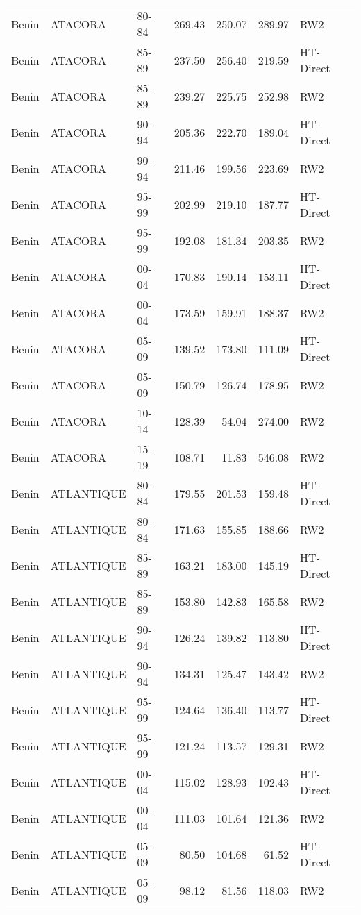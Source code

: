 \begin{longtable}{lllrrrl}
  Benin & ATACORA & 80-84 & 269.43 & 250.07 & 289.97 & RW2 \\ 
  Benin & ATACORA & 85-89 & 237.50 & 256.40 & 219.59 & HT-Direct \\ 
  Benin & ATACORA & 85-89 & 239.27 & 225.75 & 252.98 & RW2 \\ 
  Benin & ATACORA & 90-94 & 205.36 & 222.70 & 189.04 & HT-Direct \\ 
  Benin & ATACORA & 90-94 & 211.46 & 199.56 & 223.69 & RW2 \\ 
  Benin & ATACORA & 95-99 & 202.99 & 219.10 & 187.77 & HT-Direct \\ 
  Benin & ATACORA & 95-99 & 192.08 & 181.34 & 203.35 & RW2 \\ 
  Benin & ATACORA & 00-04 & 170.83 & 190.14 & 153.11 & HT-Direct \\ 
  Benin & ATACORA & 00-04 & 173.59 & 159.91 & 188.37 & RW2 \\ 
  Benin & ATACORA & 05-09 & 139.52 & 173.80 & 111.09 & HT-Direct \\ 
  Benin & ATACORA & 05-09 & 150.79 & 126.74 & 178.95 & RW2 \\ 
  Benin & ATACORA & 10-14 & 128.39 & 54.04 & 274.00 & RW2 \\ 
  Benin & ATACORA & 15-19 & 108.71 & 11.83 & 546.08 & RW2 \\ 
  Benin & ATLANTIQUE & 80-84 & 179.55 & 201.53 & 159.48 & HT-Direct \\ 
  Benin & ATLANTIQUE & 80-84 & 171.63 & 155.85 & 188.66 & RW2 \\ 
  Benin & ATLANTIQUE & 85-89 & 163.21 & 183.00 & 145.19 & HT-Direct \\ 
  Benin & ATLANTIQUE & 85-89 & 153.80 & 142.83 & 165.58 & RW2 \\ 
  Benin & ATLANTIQUE & 90-94 & 126.24 & 139.82 & 113.80 & HT-Direct \\ 
  Benin & ATLANTIQUE & 90-94 & 134.31 & 125.47 & 143.42 & RW2 \\ 
  Benin & ATLANTIQUE & 95-99 & 124.64 & 136.40 & 113.77 & HT-Direct \\ 
  Benin & ATLANTIQUE & 95-99 & 121.24 & 113.57 & 129.31 & RW2 \\ 
  Benin & ATLANTIQUE & 00-04 & 115.02 & 128.93 & 102.43 & HT-Direct \\ 
  Benin & ATLANTIQUE & 00-04 & 111.03 & 101.64 & 121.36 & RW2 \\ 
  Benin & ATLANTIQUE & 05-09 & 80.50 & 104.68 & 61.52 & HT-Direct \\ 
  Benin & ATLANTIQUE & 05-09 & 98.12 & 81.56 & 118.03 & RW2 \\ 

\end{longtable}
